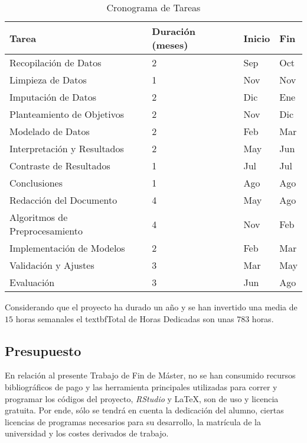 \begin{table}[H]
    \centering
    \renewcommand{\arraystretch}{1.2} %
    \begin{tabular}{p{4cm} p{2.5cm} p{2.5cm} p{2.5cm}}
    \toprule
    \textbf{Tarea} & \textbf{Duración (meses)} & \textbf{Inicio} & \textbf{Fin} \\
    \midrule
    Recopilación de Datos          & 2 & Sep & Oct \\
    Limpieza de Datos              & 1 & Nov & Nov \\
    Imputación de Datos            & 2 & Dic & Ene \\
    Planteamiento de Objetivos     & 2 & Nov & Dic \\
    Modelado de Datos              & 2 & Feb & Mar \\
    Interpretación y Resultados    & 2 & May & Jun \\
    Contraste de Resultados        & 1 & Jul & Jul \\
    Conclusiones                   & 1 & Ago & Ago \\
    Redacción del Documento        & 4 & May & Ago \\
    Algoritmos de Preprocesamiento & 4 & Nov & Feb \\
    Implementación de Modelos      & 2 & Feb & Mar \\
    Validación y Ajustes           & 3 & Mar & May \\
    Evaluación                     & 3 & Jun & Ago \\
    \bottomrule
    \end{tabular}
    \caption{Cronograma de Tareas}\label{tab:gantt}
    \end{table}

Considerando que el proyecto ha durado un año y se han invertido una media de $15$ horas semanales el textbf{Total de Horas Dedicadas} son unas $783$ horas. 



\subsection{Presupuesto}\label{sec:presupuesto}

En relación al presente Trabajo de Fin de Máster, no se han consumido recursos bibliográficos de pago y las herramienta principales utilizadas para correr y programar los códigos del proyecto, \textit{RStudio} y \LaTeX, son de uso y licencia gratuita. Por ende, sólo se tendrá en cuenta la dedicación del alumno, ciertas licencias de programas necesarios para su desarrollo, la matrícula de la universidad y los costes derivados de trabajo.

